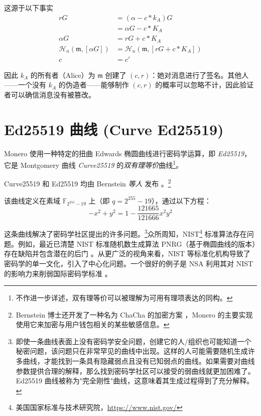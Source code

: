 这源于以下事实
\begin{align*}
 	r G &= (\alpha - c*k_A) G \\
 		&= \alpha G - c*K_A \\
\alpha G &= r G + c*K_A \\
\mathcal{H}_n(\mathfrak{m},[\alpha G]) &= \mathcal{H}_n(\mathfrak{m},[r G + c*K_A]) \\
       c &= c'
\end{align*}

因此 $k_A$ 的所有者（Alice）为 $\mathfrak{m}$ 创建了 $(c,r)$：她对消息进行了签名。其他人——一个没有 $k_A$ 的伪造者——能够制作 $(c,r)$ 的概率可以忽略不计，因此验证者可以确信消息没有被篡改。



\section{Ed25519 曲线 (Curve Ed25519)}
\label{Ed25519_section}

Monero 使用一种特定的扭曲 Edwards 椭圆曲线进行密码学运算，即 {\em Ed25519}，它是 Montgomery 曲线 {\em Curve25519} 的{\em 双有理等价}曲线\footnote{\label{birational_note}不作进一步详述，双有理等价可以被理解为可用有理项表达的同构。}。

Curve25519 和 Ed25519 均由 Bernstein {\em 等人} 发布 \cite{Bernstein2008, Bernstein2012, Bernstein2007}。\footnote{Bernstein 博士还开发了一种名为 ChaCha 的加密方案 \cite{Bernstein_chacha,chacha-irtf}，Monero 的主要实现使用它来加密与用户钱包相关的某些敏感信息。}

该曲线定义在素域 \(\mathbb{F}_{2^{255} - 19}\) 上（即 $q = 2^{255}-19$），通过以下方程：\vspace{.175cm}
\[-x^2 + y^2 = 1 - \frac{121665}{121666} x^2 y^2\]

这条曲线解决了密码学社区提出的许多问题。\footnote{即使一条曲线表面上没有密码学安全问题，创建它的人/组织也可能知道一个秘密问题，该问题只在非常罕见的曲线中出现。这样的人可能需要随机生成许多曲线，才能找到一条具有隐藏弱点且没有已知弱点的曲线。如果需要对曲线参数提供合理的解释，那么找到密码学社区可以接受的弱曲线就更加困难了。Ed25519 曲线被称为"完全刚性"曲线，这意味着其生成过程得到了充分解释。\cite{elliptic-curve-rigidity}}众所周知，NIST\footnote{\label{NIST_note}美国国家标准与技术研究院，\url{https://www.nist.gov/}}
标准算法存在问题。例如，最近已清楚 NIST 标准随机数生成算法 PNRG（基于椭圆曲线的版本）存在缺陷并包含潜在的后门 \cite{hales2014nsa}。从更广泛的视角来看，NIST 等标准化机构导致了密码学的单一文化，引入了中心化问题。一个很好的例子是 NSA 利用其对 NIST 的影响力来削弱国际密码学标准 \cite{NSA-NIST}。

